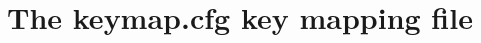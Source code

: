 \documentclass[Orbiter Developer Manual.tex]{subfiles}
\begin{document}
\section{The keymap.cfg key mapping file}

\end{document}
